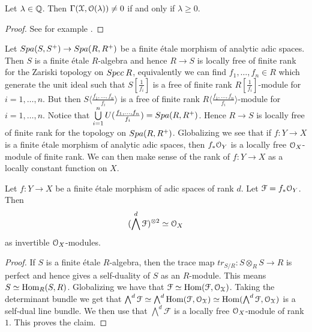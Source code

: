 \begin{prop}
\label{globalsectionprop}
Let  $\lambda\in\mathbb{Q}$. Then 
$\Gamma(\mathcal{X},\mathcal{O}(\lambda))\neq0$ if and only if $\lambda\geq0$.
\end{prop}
\begin{proof}
See for example \cite[corollary 13.5.5]{SW20}.
\end{proof}

Let ${Spa({S},{S{^{+}}})}\to{Spa({R},{R{^{+}}})}$ be a  finite \'etale morphism of analytic adic spaces. Then $S$ is a finite \'etale $R$-algebra and hence $R\to S$
is locally free of finite rank for the Zariski topology on ${Spec{\:R}}$, equivalently we can find $f_1,\dots,f_n\in R$ which generate the unit ideal such that
$S[\tfrac{1}{f_i}]$ is a free of finite rank $R[\tfrac{1}{f_i}]$-module for $i=1,\dots,n$.
But then $S\langle\tfrac{f_1,\dots,f_n}{f_i}\rangle$ is a free of finite rank $R\langle\tfrac{f_1,\dots,f_n}{f_i}\rangle$-module for $i=1,\dots,n$.
Notice that $\bigcup\limits_{i=1}^{n}U(\tfrac{f_1,\dots,f_n}{f_i}) = {Spa({R},{R{^{+}}})}$.  
Hence $R\to S$ is locally free of finite rank for the topology on ${Spa({R},{R{^{+}}})}$.  
Globalizing we see that if $f\colon Y\to X$  is a finite \'etale morphism of analytic adic spaces, then $f_\ast\mathcal{O}_{Y}$ is a locally free $\mathcal{O}_{X}$-module of finite rank.
We can then make sense of the rank of $f\colon Y\to X$  as a locally constant function on $X$.

\begin{lemma}
\label{keylemma2}
Let $f\colon Y\to X$  be a finite \'etale morphism of adic spaces of rank $d$.
Let $\mathcal{F} = f_\ast\mathcal{O}_{Y}$.
Then 
\[(\bigwedge^d\mathcal{F})^{\otimes2}\simeq\mathcal{O}_{X}\]
as  invertible $\mathcal{O}_{X}$-modules.
\end{lemma}
\begin{proof}
If $S$ is a finite \'etale $R$-algebra, then the trace map $tr_{S/R}\colon S\otimes_R S\to R$ is perfect and hence gives a self-duality of $S$ as an $R$-module. This means $S\simeq{\rm{Hom}}_{R}(S,R)$.
Globalizing we have that $\mathcal{F}\simeq{\rm{Hom}}(\mathcal{F},\mathcal{O}_{\mathcal{X}})$. Taking the determinant bundle we get that
$\bigwedge^d\mathcal{F}\simeq\bigwedge^d {\rm{Hom}}(\mathcal{F},\mathcal{O}_{\mathcal{X}}) \simeq {\rm{Hom}}(\bigwedge^d\mathcal{F}, \mathcal{O}_{\mathcal{X}})$ is a self-dual line bundle. We then use that $\bigwedge^d\mathcal{F}$ is a locally free $\mathcal{O}_{X}$-module of rank $1$.
This proves the claim.
\end{proof}



